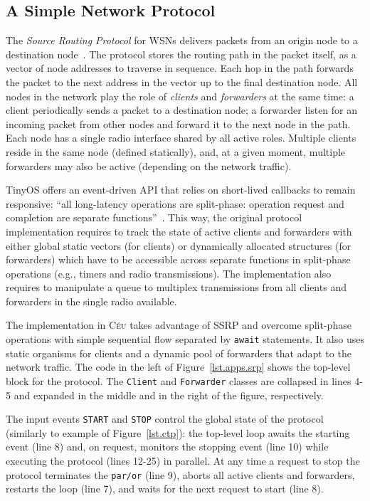 \documentclass{sigplanconf}
\newcommand{\CEU}{\textsc{C\'{e}u}\xspace}
\newcommand{\code}[1] {{\small{\texttt{#1}}}}
\newcommand{\1}{\;}
\newcommand{\2}{\;\;}
\newcommand{\3}{\;\;\;}
\newcommand{\5}{\;\;\;\;\;}
\begin{document}
\subsection{A Simple Network Protocol}
\label{sec.apps.srp}

The \emph{Source Routing Protocol} for WSNs delivers packets from an origin 
node to a destination node~\cite{wsn.teps}.
The protocol stores the routing path in the packet itself, as a vector of node 
addresses to traverse in sequence.
Each hop in the path forwards the packet to the next address in the vector up 
to the final destination node.
%
All nodes in the network play the role of \emph{clients} and \emph{forwarders} 
at the same time:
%
a client periodically sends a packet to a destination node;
a forwarder listen for an incoming packet from other nodes and forward it to 
the next node in the path.
%
Each node has a single radio interface shared by all active roles.
Multiple clients reside in the same node (defined statically), and, at a given 
moment, multiple forwarders may also be active (depending on the network 
traffic).

TinyOS offers an event-driven API that relies on short-lived callbacks to 
remain responsive:
``all long-latency operations are split-phase: operation request and completion 
are separate functions''~\cite{wsn.nesc}.
This way, the original protocol implementation requires to track the state of 
active clients and forwarders with either global static vectors (for clients) 
or dynamically allocated structures (for forwarders) which have to be 
accessible across separate functions in split-phase operations (e.g., timers 
and radio transmissions).
The implementation also requires to manipulate a queue to multiplex 
transmissions from all clients and forwarders in the single radio available.

The implementation in \CEU takes advantage of SSRP and overcome split-phase 
operations with simple sequential flow separated by \code{await} statements.
It also uses static organisms for clients and a dynamic pool of forwarders that 
adapt to the network traffic.
%
The code in the left of Figure~\ref{lst.apps.srp} shows the top-level block for 
the protocol.
The \code{Client} and \code{Forwarder} classes are collapsed in lines 4-5 and 
expanded in the middle and in the right of the figure, respectively.

The input events \code{START} and \code{STOP} control the global state of the 
protocol (similarly to example of Figure~\ref{lst.ctp}):
the top-level loop awaits the starting event (line 8) and, on request, monitors 
the stopping event (line 10) while executing the protocol (lines 12-25) in 
parallel.
%
At any time a request to stop the protocol terminates the \code{par/or} (line 
9), aborts all active clients and forwarders, restarts the loop (line 7), and 
waits for the next request to start (line 8).
\end{document}

